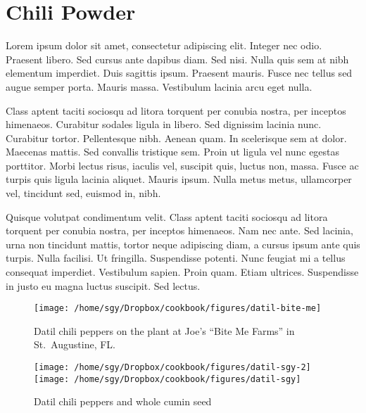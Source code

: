 \documentclass[12pt, draft]{book}
\begin{document}
\chapter{Chili Powder}

Lorem ipsum dolor sit amet, consectetur adipiscing elit. Integer nec
odio. Praesent libero. Sed cursus ante dapibus diam. Sed nisi. Nulla
quis sem at nibh elementum imperdiet. Duis sagittis ipsum. Praesent
mauris. Fusce nec tellus sed augue semper porta. Mauris
massa. Vestibulum lacinia arcu eget nulla.

Class aptent taciti sociosqu ad litora torquent per conubia nostra,
per inceptos himenaeos. Curabitur sodales ligula in libero. Sed
dignissim lacinia nunc. Curabitur tortor. Pellentesque nibh. Aenean
quam. In scelerisque sem at dolor. Maecenas mattis. Sed convallis
tristique sem. Proin ut ligula vel nunc egestas porttitor. Morbi
lectus risus, iaculis vel, suscipit quis, luctus non, massa. Fusce ac
turpis quis ligula lacinia aliquet. Mauris ipsum. Nulla metus metus,
ullamcorper vel, tincidunt sed, euismod in, nibh.

Quisque volutpat condimentum velit. Class aptent taciti sociosqu ad
litora torquent per conubia nostra, per inceptos himenaeos. Nam nec
ante. Sed lacinia, urna non tincidunt mattis, tortor neque adipiscing
diam, a cursus ipsum ante quis turpis. Nulla facilisi. Ut
fringilla. Suspendisse potenti. Nunc feugiat mi a tellus consequat
imperdiet. Vestibulum sapien. Proin quam. Etiam ultrices. Suspendisse
in justo eu magna luctus suscipit. Sed lectus.
\clearpage
\begin{figure}
\begin{center}
\texttt{[image: /home/sgy/Dropbox/cookbook/figures/datil-bite-me]}
\end{center}
\caption*{Datil chili peppers on the plant at Joe's ``Bite Me Farms'' in St.\ Augustine, FL.}
\end{figure}

\begin{figure}
\begin{center}
\texttt{[image: /home/sgy/Dropbox/cookbook/figures/datil-sgy-2]}
\texttt{[image: /home/sgy/Dropbox/cookbook/figures/datil-sgy]}
\end{center}
\caption*{Datil chili peppers and whole cumin seed}
\end{figure}

\clearpage

\clearpage

\newpage

\newpage

\newpage

\end{document}
